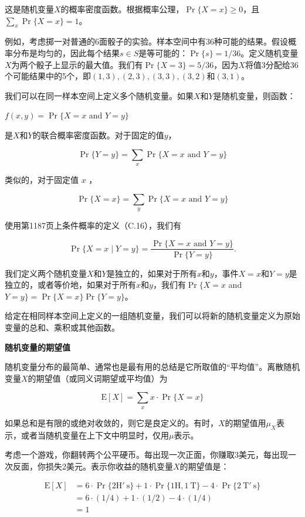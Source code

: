 \documentclass[lang=cn,newtx,10pt,scheme=chinese]{elegantbook}
\begin{document}
这是随机变量$X$的概率密度函数。根据概率公理，$\operatorname{Pr}\{X=x\} \geq 0$，且$\sum_x \operatorname{Pr}\{X=x\}=1$。

例如，考虑掷一对普通的6面骰子的实验。样本空间中有36种可能的结果。假设概率分布是均匀的，因此每个结果$s \in S$是等可能的：$\operatorname{Pr}\{s\}=1 / 36$。定义随机变量$X$为两个骰子上显示的最大值。我们有$\operatorname{Pr}\{X=3\}=5 / 36$，因为$X$将值3分配给36个可能结果中的5个，即$(1,3),(2,3),(3,3),(3,2)$和$(3,1)$。

我们可以在同一样本空间上定义多个随机变量。如果$X$和$Y$是随机变量，则函数：

$f(x, y)=\operatorname{Pr}\{X=x$ and $Y=y\}$

是$X$和$Y$的联合概率密度函数。对于固定的值$y$，

$$
\operatorname{Pr}\{Y=y\}=\sum_x \operatorname{Pr}\{X=x \text { and } Y=y\}
$$

类似的，对于固定值 $x$ ，

$$
\operatorname{Pr}\{X=x\}=\sum_y \operatorname{Pr}\{X=x \text { and } Y=y\}
$$

使用第1187页上条件概率的定义（C.16），我们有

$$
\operatorname{Pr}\{X=x \mid Y=y\}=\frac{\operatorname{Pr}\{X=x \text { and } Y=y\}}{\operatorname{Pr}\{Y=y\}} .
$$

我们定义两个随机变量$X$和$Y$是独立的，如果对于所有$x$和$y$，事件$X=x$和$Y=y$是独立的，或者等价地，如果对于所有$x$和$y$，我们有$\operatorname{Pr}\{X=x$ and $Y=y\}=\operatorname{Pr}\{X=x\} \operatorname{Pr}\{Y=y\}$。

给定在相同样本空间上定义的一组随机变量，我们可以将新的随机变量定义为原始变量的总和、乘积或其他函数。

\textbf{随机变量的期望值}

随机变量分布的最简单、通常也是最有用的总结是它所取值的“平均值”。离散随机变量$X$的期望值（或同义词期望或平均值）为

$$
\mathrm{E}[X]=\sum_x x \cdot \operatorname{Pr}\{X=x\}
$$

如果总和是有限的或绝对收敛的，则它是良定义的。有时，$X$的期望值用$\mu_X$表示，或者当随机变量在上下文中明显时，仅用$\mu$表示。

考虑一个游戏，你翻转两个公平硬币。每出现一次正面，你赚取3美元，每出现一次反面，你损失2美元。表示你收益的随机变量$X$的期望值是：

$$
\begin{aligned}
\mathrm{E}[X] & =6 \cdot \operatorname{Pr}\{2 \mathrm{H} ' \mathrm{~s}\}+1 \cdot \operatorname{Pr}\{1 \mathrm{H}, 1 \mathrm{~T}\}-4 \cdot \operatorname{Pr}\{2 \mathrm{~T} ' \mathrm{~s}\} \\
& =6 \cdot(1 / 4)+1 \cdot(1 / 2)-4 \cdot(1 / 4) \\
& =1
\end{aligned}
$$
\end{document}
